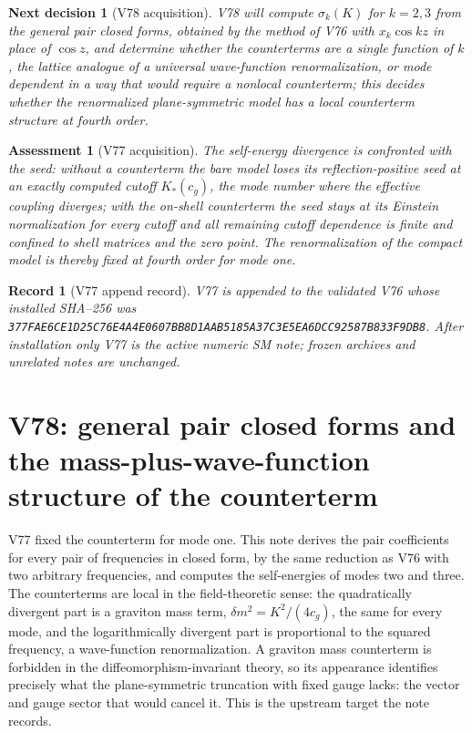 \documentclass[11pt]{article}
\newtheorem{decision}[theorem]{Next decision}
\newtheorem{assessment}[theorem]{Assessment}
\newtheorem{record}[theorem]{Record}
\theoremstyle{remark}
\begin{document}
\begin{decision}[V78 acquisition]
\label{dec:v19v77-next}
V78 will compute \(\sigma_k(K)\) for \(k=2,3\) from the general pair
closed forms, obtained by the method of V76 with \(x_k\cos kz\) in
place of \(\cos z\), and determine whether the counterterms are a
single function of \(k\), the lattice analogue of a universal
wave-function renormalization, or mode dependent in a way that would
require a nonlocal counterterm; this decides whether the renormalized
plane-symmetric model has a local counterterm structure at fourth
order.
\end{decision}

\begin{assessment}[V77 acquisition]
\label{ass:v19v77}
The self-energy divergence is confronted with the seed: without a
counterterm the bare model loses its reflection-positive seed at an
exactly computed cutoff \(K_*(c_g)\), the mode number where the
effective coupling diverges; with the on-shell counterterm the seed
stays at its Einstein normalization for every cutoff and all remaining
cutoff dependence is finite and confined to shell matrices and the
zero point.  The renormalization of the compact model is thereby fixed
at fourth order for mode one.
\end{assessment}

\begin{record}[V77 append record]
\label{rec:v19v77}
V77 is appended to the validated V76 whose installed SHA--256 was
\texttt{377FAE6CE1D25C76E4A4E0607BB8D1AAB5185A37C3E5EA6DCC92587B833F9DB8}.
After installation only V77 is the active numeric SM note; frozen
archives and unrelated notes are unchanged.
\end{record}


\section{V78: general pair closed forms and the mass-plus-wave-function structure of the counterterm}
\label{sec:v19v78}

V77 fixed the counterterm for mode one.  This note derives the pair
coefficients for every pair of frequencies in closed form, by the same
reduction as V76 with two arbitrary frequencies, and computes the
self-energies of modes two and three.  The counterterms are local in
the field-theoretic sense: the quadratically divergent part is a
graviton mass term, \(\delta m^2=K^2/(4c_g)\), the same for every
mode, and the logarithmically divergent part is proportional to the
squared frequency, a wave-function renormalization.  A graviton mass
counterterm is forbidden in the diffeomorphism-invariant theory, so its
appearance identifies precisely what the plane-symmetric truncation
with fixed gauge lacks: the vector and gauge sector that would cancel
it.  This is the upstream target the note records.
\end{document}
